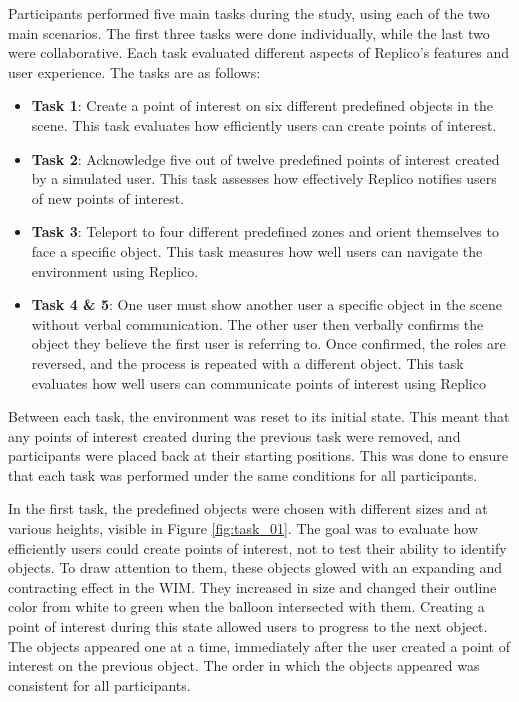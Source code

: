         Participants performed five main tasks during the study, using each of the two main scenarios. The first three tasks were done individually, while the last two were collaborative. Each task evaluated different aspects of Replico's features and user experience. The tasks are as follows:

        \begin{itemize}
            \item \textbf{Task 1}: Create a point of interest on six different predefined objects in the scene. This task evaluates how efficiently users can create points of interest.
            \item \textbf{Task 2}: Acknowledge five out of twelve predefined points of interest created by a simulated user. This task assesses how effectively Replico notifies users of new points of interest.
            \item \textbf{Task 3}: Teleport to four different predefined zones and orient themselves to face a specific object. This task measures how well users can navigate the environment using Replico.
            \item \textbf{Task 4 \& 5}: One user must show another user a specific object in the scene without verbal communication. The other user then verbally confirms the object they believe the first user is referring to. Once confirmed, the roles are reversed, and the process is repeated with a different object. This task evaluates how well users can communicate points of interest using Replico
        \end{itemize}

        Between each task, the environment was reset to its initial state. This meant that any points of interest created during the previous task were removed, and participants were placed back at their starting positions. This was done to ensure that each task was performed under the same conditions for all participants.

        In the first task, the predefined objects were chosen with different sizes and at various heights, visible in Figure \ref{fig:task_01}. The goal was to evaluate how efficiently users could create points of interest, not to test their ability to identify objects. To draw attention to them, these objects glowed with an expanding and contracting effect in the WIM. They increased in size and changed their outline color from white to green when the balloon intersected with them. Creating a point of interest during this state allowed users to progress to the next object. The objects appeared one at a time, immediately after the user created a point of interest on the previous object. The order in which the objects appeared was consistent for all participants.

